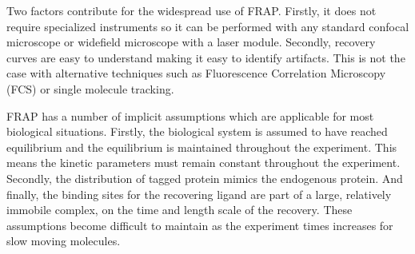     Two factors contribute for the widespread use of FRAP.
    Firstly, it does not require specialized instruments
    so it can be performed with
    any standard confocal microscope or widefield microscope with a laser
    module.
    Secondly, recovery curves are easy to understand making it easy to
    identify artifacts.  This is not the case with alternative techniques
    such as Fluorescence Correlation Microscopy (FCS) or single molecule
    tracking.

    FRAP has a number of implicit assumptions which are applicable
    for most biological situations.
    Firstly, the biological system is assumed to have
    reached equilibrium and the equilibrium
    is maintained throughout the experiment.
    This means the kinetic parameters
    must remain constant throughout the experiment.
    Secondly, the distribution of tagged protein mimics the endogenous
    protein.
    And finally, the binding sites for the recovering ligand
    are part of a large, relatively immobile
    complex, on the time and length scale of the recovery.
    These assumptions become difficult to maintain as the experiment
    times increases for slow moving molecules.
